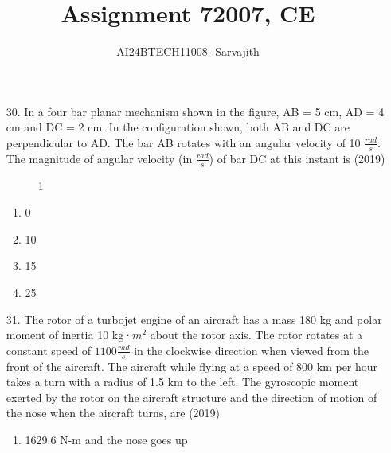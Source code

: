\documentclass[journal]{IEEEtran}
\begin{document}

\vspace{3cm}


\author{AI24BTECH11008- Sarvajith
}
\title{Assignment 7}
{\let\newpage\relax\maketitle}
\title{2007, CE}
\renewcommand{\thefigure}{\theenumi}
\renewcommand{\thetable}{\theenumi}
\setlength{\intextsep}{10pt} %
\renewcommand{\thetable}{\theenumi}
\begin{enumerate}
    \item[30.] In a four bar planar mechanism shown in the figure, AB = 5 cm, AD = 4 cm and DC = 2 cm. In the configuration shown, both AB and DC are perpendicular to AD. The bar AB rotates with an angular velocity of 10 $\frac{rad}{s}$. The magnitude of angular velocity (in $\frac{rad}{s}$) of bar DC at this instant is \hfill (2019)
    \begin{figure}[!ht]
        \centering
        \caption{1}
    \end{figure}
    \begin{enumerate}[label=(\Alph*)]
        \item 0
        \item 10
        \item 15
        \item 25
    \end{enumerate}
    \item[31.] The rotor of a turbojet engine of an aircraft has a mass 180 kg and polar moment of inertia 10 kg·$m^2$ about the rotor axis. The rotor rotates at a constant speed of $1100 \frac{rad}{s}$ in the clockwise direction when viewed from the front of the aircraft. The aircraft while flying at a speed of 800 km per hour takes a turn with a radius of 1.5 km to the left. The gyroscopic moment exerted by the rotor on the aircraft structure and the direction of motion of the nose when the aircraft turns, are \hfill (2019)
    \begin{enumerate}[label=(\Alph*)]
        \item 1629.6 N-m and the nose goes up

\end{enumerate}
\end{enumerate}
\end{document}
